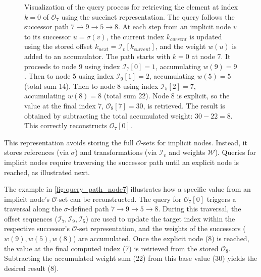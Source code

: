 \begin{figure}[htbp]
    \caption{Visualization of the query process for retrieving the element at index $k=0$ of $\mathcal{O}_7$ using the succinct representation. The query follows the successor path $7 \to 9 \to 5 \to 8$. At each step from an implicit node $v$ to its successor $u=\sigma(v)$, the current index $k_{current}$ is updated using the stored offset $k_{next} = \mathcal{I}_v[k_{current}]$, and the weight $w(u)$ is added to an accumulator. The path starts with $k=0$ at node 7. It proceeds to node 9 using index $\mathcal{I}_7[0]=1$, accumulating $w(9)=9$. Then to node 5 using index $\mathcal{I}_9[1]=2$, accumulating $w(5)=5$ (total sum 14). Then to node 8 using index $\mathcal{I}_5[2]=7$, accumulating $w(8)=8$ (total sum 22). Node 8 is explicit, so the value at the final index 7, $\mathcal{O}_8[7]=30$, is retrieved. The result is obtained by subtracting the total accumulated weight: $30 - 22 = 8$. This correctly reconstructs $\mathcal{O}_7[0]$.}
    \label{fig:query_path_node7}
\end{figure}

This representation avoids storing the full $\mathcal{O}$-sets for implicit nodes. Instead, it stores references (via $\sigma$) and transformations (via $\mathcal{I}_v$ and weights $\mathcal{W}$). Queries for implicit nodes require traversing the successor path until an explicit node is reached, as illustrated next.

The example in \autoref{fig:query_path_node7} illustrates how a specific value from an implicit node's $\mathcal{O}$-set can be reconstructed. The query for $\mathcal{O}_7[0]$ triggers a traversal along the $\sigma$-defined path $7 \to 9 \to 5 \to 8$. During this traversal, the offset sequences ($\mathcal{I}_7, \mathcal{I}_9, \mathcal{I}_5$) are used to update the target index within the respective successor's $\mathcal{O}$-set representation, and the weights of the successors ($w(9), w(5), w(8)$) are accumulated. Once the explicit node (8) is reached, the value at the final computed index (7) is retrieved from the stored $\mathcal{O}_8$. Subtracting the accumulated weight sum (22) from this base value (30) yields the desired result (8).

